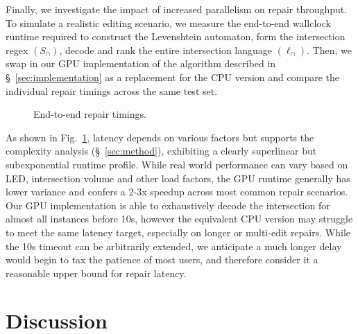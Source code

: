 \documentclass[sigplan,review,acmsmall,nonacm,screen,anonymous]{acmart}\settopmatter{printfolios=false,printccs=false,printacmref=false}
\begin{document}

Finally, we investigate the impact of increased parallelism on repair throughput. To simulate a realistic editing scenario, we measure the end-to-end wallclock runtime required to construct the Levenshtein automaton, form the intersection regex $(S_\cap)$, decode and rank the entire intersection language $(\ell_\cap)$. Then, we swap in our GPU implementation of the algorithm described in \S~\ref{sec:implementation} as a replacement for the CPU version and compare the individual repair timings across the same test set.
\begin{figure}
\vspace{-0.2cm}
\resizebox{.38\textwidth}{!}{}
\vspace{-0.7cm}
\caption{End-to-end repair timings.}
\label{fig:timings}
\vspace{-0.3cm}
\end{figure}

\noindent As shown in Fig.~\ref{fig:timings}, latency depends on various factors but supports the complexity analysis (\S~\ref{sec:method}), exhibiting a clearly superlinear but subexponential runtime profile. While real world performance can vary based on LED, intersection volume and other load factors, the GPU runtime generally has lower variance and confers a 2-3x speedup across most common repair scenarios. Our GPU implementation is able to exhaustively decode the intersection for almost all instances before 10s, however the equivalent CPU version may struggle to meet the same latency target, especially on longer or multi-edit repairs. While the 10s timeout can be arbitrarily extended, we anticipate a much longer delay would begin to tax the patience of most users, and therefore consider it a reasonable upper bound for repair latency.

\clearpage\section{Discussion}\label{sec:discussion}
\end{document}
